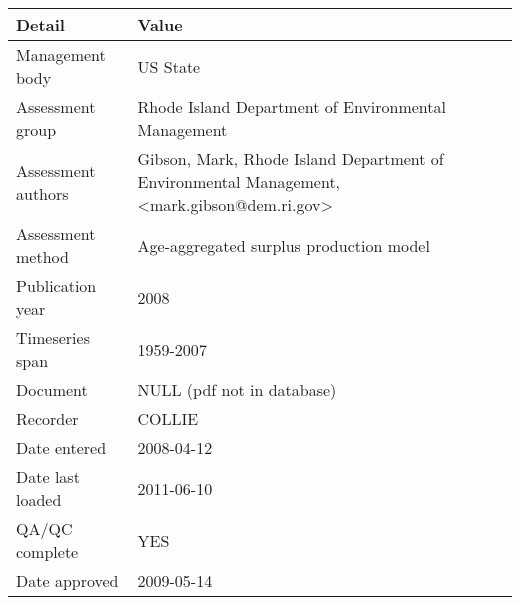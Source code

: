 \begin{table}[htb]
\centering
\begin{tabular}{lp{7cm}}
\toprule
Detail & Value \\
\midrule
Management body    & US State                                                                                    \\
Assessment group   & Rhode Island Department of Environmental Management                                         \\
Assessment authors & Gibson, Mark, Rhode Island Department of Environmental Management, <mark.gibson@dem.ri.gov> \\
Assessment method  & Age-aggregated surplus production model                                                     \\
Publication year   & 2008                                                                                        \\
Timeseries span    & 1959-2007                                                                                   \\
Document           & NULL (pdf not in database)                                                                  \\
Recorder           & COLLIE                                                                                      \\
Date entered       & 2008-04-12                                                                                  \\
Date last loaded   & 2011-06-10                                                                                  \\
QA/QC complete     & YES                                                                                         \\
Date approved      & 2009-05-14                                                                                  \\
\bottomrule
\end{tabular}
\label{tab:assessdet}
\end{table}
